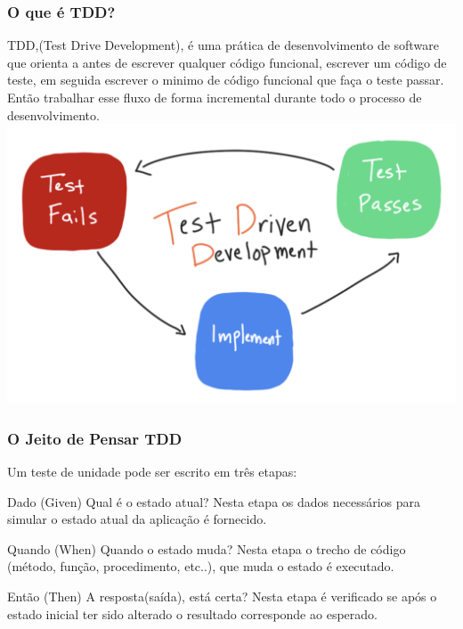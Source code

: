 \documentclass{beamer}
\begin{document}
\begin{frame}
\frametitle{O que é TDD?}
TDD,(Test Drive Development), é uma prática de desenvolvimento de software que orienta a antes de escrever qualquer código funcional, escrever um código de teste, em seguida escrever o minimo de código funcional que faça o teste passar. Então trabalhar esse fluxo de forma incremental durante todo o processo de desenvolvimento.
\includegraphics[scale=0.15]{tdd_diagram_flow}
 
\end{frame}

\begin{frame}
	\frametitle{O Jeito de Pensar TDD}
	Um teste de unidade pode ser escrito em três etapas:
	\begin{block}{Dado (Given)}
		Qual é o estado atual? Nesta etapa os dados necessários para simular o estado atual da aplicação é fornecido.
	\end{block}
	
	\begin{block}{Quando (When)}
		Quando o estado muda? Nesta etapa o trecho de código (método, função, procedimento, etc..), que muda o estado é executado.
	\end{block}
	
	\begin{block}{Então (Then)}
		A resposta(saída), está certa? Nesta etapa é verificado se após o estado inicial ter sido alterado o resultado corresponde ao esperado.
	\end{block}
	
\end{frame}
\end{document}
